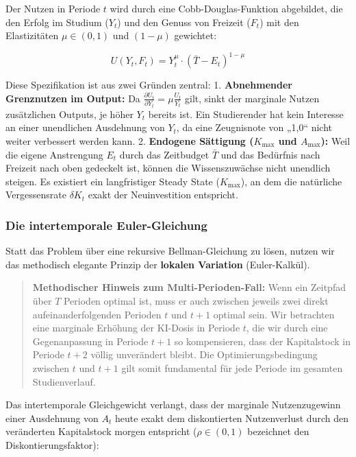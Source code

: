 \documentclass[
  ngerman,
  letterpaper,
  DIV=11]{scrartcl}
\begin{document}
Der Nutzen in Periode \(t\) wird durch eine Cobb-Douglas-Funktion
abgebildet, die den Erfolg im Studium (\(Y_t\)) und den Genuss von
Freizeit (\(F_t\)) mit den Elastizitäten \(\mu \in (0, 1)\) und
\((1-\mu)\) gewichtet:

\[U(Y_t, F_t) = Y_t^\mu \cdot (\bar{T} - E_t)^{1-\mu}\]

Diese Spezifikation ist aus zwei Gründen zentral: 1. \textbf{Abnehmender
Grenznutzen im Output:} Da
\(\frac{\partial U_t}{\partial Y_t} = \mu \frac{U_t}{Y_t}\) gilt, sinkt
der marginale Nutzen zusätzlichen Outputs, je höher \(Y_t\) bereits ist.
Ein Studierender hat kein Interesse an einer unendlichen Ausdehnung von
\(Y_t\), da eine Zeugnisnote von „1,0`` nicht weiter verbessert werden
kann. 2. \textbf{Endogene Sättigung (\(K_{\max}\) und \(A_{\max}\)):}
Weil die eigene Anstrengung \(E_t\) durch das Zeitbudget \(\bar{T}\) und
das Bedürfnis nach Freizeit nach oben gedeckelt ist, können die
Wissenszuwächse nicht unendlich steigen. Es existiert ein langfristiger
Steady State (\(K_{\max}\)), an dem die natürliche Vergessensrate
\(\delta K_t\) exakt der Neuinvestition entspricht.

\subsubsection{Die intertemporale
Euler-Gleichung}\label{die-intertemporale-euler-gleichung}

Statt das Problem über eine rekursive Bellman-Gleichung zu lösen, nutzen
wir das methodisch elegante Prinzip der \textbf{lokalen Variation}
(Euler-Kalkül).

\begin{quote}
\textbf{Methodischer Hinweis zum Multi-Perioden-Fall:} Wenn ein Zeitpfad
über \(T\) Perioden optimal ist, muss er auch zwischen jeweils zwei
direkt aufeinanderfolgenden Perioden \(t\) und \(t+1\) optimal sein. Wir
betrachten eine marginale Erhöhung der KI-Dosis in Periode \(t\), die
wir durch eine Gegenanpassung in Periode \(t+1\) so kompensieren, dass
der Kapitalstock in Periode \(t+2\) völlig unverändert bleibt. Die
Optimierungsbedingung zwischen \(t\) und \(t+1\) gilt somit fundamental
für jede Periode im gesamten Studienverlauf.
\end{quote}

Das intertemporale Gleichgewicht verlangt, dass der marginale
Nutzenzugewinn einer Ausdehnung von \(A_t\) heute exakt dem
diskontierten Nutzenverlust durch den veränderten Kapitalstock morgen
entspricht (\(\rho \in (0,1)\) bezeichnet den Diskontierungsfaktor):
\end{document}
